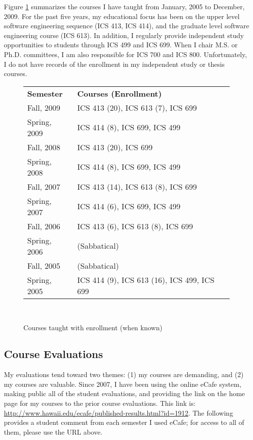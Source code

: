 \documentclass[11pt]{article}
\begin{document}
Figure \ref{fig:courses} summarizes the courses I have taught from January,
2005 to December, 2009.  For the past five years, my educational focus has
been on the upper level software engineering sequence (ICS 413, ICS 414),
and the graduate level software engineering course (ICS 613).  In addition,
I regularly provide independent study opportunities to students through ICS
499 and ICS 699. When I chair M.S. or Ph.D. committees, I am also
responsible for ICS 700 and ICS 800.  Unfortunately, I do not have records
of the enrollment in my independent study or thesis courses.

\begin{figure}[!ht]
\small
\begin{tabular}{p{1in}p{5in}} \hline
{\bf Semester} & {\bf Courses (Enrollment)}  \\
Fall, 2009 & ICS 413 (20), ICS 613 (7), ICS 699 \\
Spring, 2009 & ICS 414 (8), ICS 699, ICS 499 \\
Fall, 2008 & ICS 413 (20), ICS 699 \\
Spring, 2008 & ICS 414 (8), ICS 699, ICS 499 \\
Fall, 2007 & ICS 413 (14), ICS 613 (8), ICS 699 \\
Spring, 2007 & ICS 414 (6), ICS 699, ICS 499 \\ 
Fall, 2006 & ICS 413 (6), ICS 613 (8), ICS 699 \\
Spring, 2006 & (Sabbatical)  \\
Fall, 2005 & (Sabbatical) \\
Spring, 2005 & ICS 414 (9), ICS 613 (16), ICS 499, ICS 699 \\ \hline
\end{tabular} \\ 
\normalsize
\caption{Courses taught with enrollment (when known)}
\label{fig:courses}
\end{figure}

\subsection{Course Evaluations}

My evaluations tend toward two themes: (1) my courses
are demanding, and (2) my courses are valuable.  Since 2007, I have been
using the online eCafe system, making public all of the student
evaluations, and providing the link on the home page for my courses to the
prior course evaluations.  This link is:
\url{http://www.hawaii.edu/ecafe/published-results.html?id=1912}. 
The following provides a student comment from each semester I used eCafe; for
access to all of them, please use the URL above. 
\end{document}

